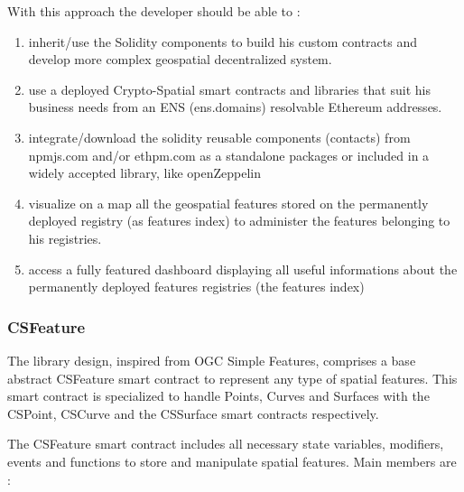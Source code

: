 \documentclass{isprs} %
\begin{document}
With this approach the developer should be able to : 

\begin{enumerate}
\setlength\itemsep{0em}\setlength\parskip{0em}\setlength\topsep{0em}\setlength\partopsep{0em}\setlength\parsep{0em} 
\item{inherit/use the Solidity components to build his custom contracts and develop more complex geospatial decentralized system.} 
\item{use a deployed Crypto-Spatial smart contracts and libraries that suit his business needs from an ENS (ens.domains) resolvable Ethereum addresses.}
\item{integrate/download the solidity reusable components (contacts) from npmjs.com and/or ethpm.com as a standalone packages or included in a widely accepted library, like openZeppelin \cite{openzeppelin}}
\item{visualize on a map all the geospatial features stored on the permanently deployed registry (as features index) to administer the features belonging to his registries.}
\item{access a fully featured dashboard displaying all useful informations about the permanently deployed features registries (the features index)}
\end{enumerate}

\subsubsection{CSFeature}\label{sec:CSFeature}

The library design, inspired from OGC Simple Features, comprises a base abstract CSFeature smart contract to represent any type of spatial features. This smart contract is specialized to handle Points, Curves and Surfaces with the CSPoint, CSCurve and the CSSurface smart contracts respectively.

The CSFeature smart contract includes all necessary state variables, modifiers, events and functions to store and manipulate spatial features. Main members are :
\end{document}
